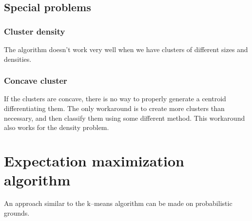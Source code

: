 \subsection{Special problems}
\subsubsection{Cluster density}
The algorithm doesn't work very well when we have clusters of different sizes and densities.
\subsubsection{Concave cluster}
If the clusters are concave, there is no way to properly generate a centroid differentiating them.
The only workaround is to create more clusters than necessary, and then classify them using some different method.
\nt
{
    This workaround also works for the density problem.
}


\section{Expectation maximization algorithm}

An approach similar to the k--means algorithm can be made on probabilistic grounds.

